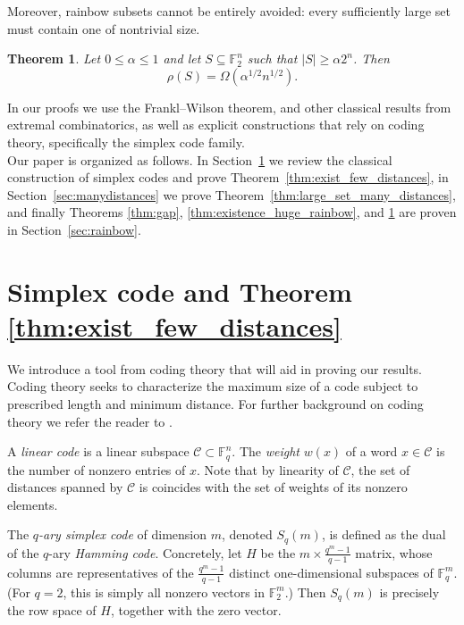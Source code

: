 \documentclass{article}
\newtheorem{thm}{Theorem}%
\theoremstyle{definition}
\begin{document}
Moreover, rainbow subsets cannot be entirely avoided: every sufficiently large set must contain one of nontrivial size.
\begin{thm}\label{thm:large_set_large_rainbow}
    Let  $0\le \alpha\le 1$ and let $S\subseteq \mathbb{F}_2^n$ such that $|S|\geq \alpha 2^n$.  Then $$
    \rho(S)=\Omega\left(\alpha^{1/2} n^{1/2}\right).$$
\end{thm}

In our proofs we use the Frankl--Wilson theorem, and other classical results from extremal combinatorics, as well as explicit constructions that rely on coding theory, specifically the simplex code family. \\


Our paper is organized as follows. In Section~\ref{sec:simplex} we review the classical construction of simplex codes and prove Theorem~\ref{thm:exist_few_distances}, in Section~\ref{sec:manydistances} we prove Theorem~\ref{thm:large_set_many_distances}, and finally Theorems \ref{thm:gap}, \ref{thm:existence_huge_rainbow}, and \ref{thm:large_set_large_rainbow} are proven in Section~\ref{sec:rainbow}.


\section{Simplex code and Theorem \ref{thm:exist_few_distances}}\label{sec:simplex}
We introduce a tool from coding theory that will aid in proving our results. Coding theory seeks to characterize the maximum size of a code subject to prescribed length  and minimum distance. For further background on coding theory we refer the reader to  \cite{lint1999introduction, huffman2010fundamentals}. 

A {\it linear code} is a linear subspace  $\mathcal{C}\subset \mathbb{F}_q^n$. The {\it weight} $w(x)$ of a word $x\in \mathcal{C}$
is the number of nonzero entries of $x$. 
Note that by linearity of $\mathcal{C}$, the set of distances spanned by $\mathcal{C}$ is coincides with the set of weights of its nonzero elements.


The 
{\it $q$-ary simplex code} of dimension 
$m$,
denoted $S_q(m)$, is defined as the dual of the 
$q$-ary {\it Hamming code}.
Concretely, 
let $H$ be the $m\times \frac{q^m-1}{q-1}$ matrix, whose columns are representatives of the $\frac{q^m-1}{q-1}$ distinct one-dimensional subspaces of $\mathbb{F}_q^m$. (For $q=2$, this is simply all nonzero vectors in $\mathbb{F}_2^m$.)
Then 
$S_q(m)$ is precisely the row space of $H$, together with the zero vector.
\end{document}

